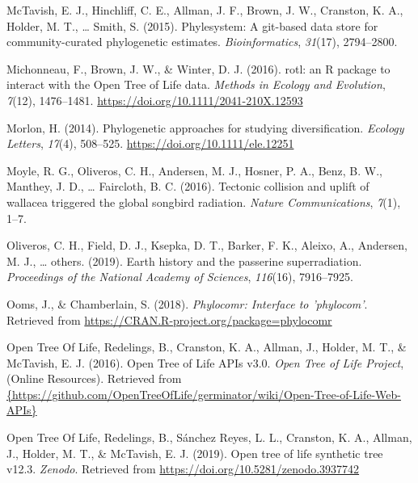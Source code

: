 \documentclass[english,man]{apa6}
\begin{document}
\leavevmode\hypertarget{ref-mctavish2015phylesystem}{}%
McTavish, E. J., Hinchliff, C. E., Allman, J. F., Brown, J. W., Cranston, K. A., Holder, M. T., \ldots{} Smith, S. (2015). Phylesystem: A git-based data store for community-curated phylogenetic estimates. \emph{Bioinformatics}, \emph{31}(17), 2794--2800.

\leavevmode\hypertarget{ref-Michonneau2016}{}%
Michonneau, F., Brown, J. W., \& Winter, D. J. (2016). rotl: an R package to interact with the Open Tree of Life data. \emph{Methods in Ecology and Evolution}, \emph{7}(12), 1476--1481. \url{https://doi.org/10.1111/2041-210X.12593}

\leavevmode\hypertarget{ref-Morlon2014}{}%
Morlon, H. (2014). Phylogenetic approaches for studying diversification. \emph{Ecology Letters}, \emph{17}(4), 508--525. \url{https://doi.org/10.1111/ele.12251}

\leavevmode\hypertarget{ref-moyle2016tectonic}{}%
Moyle, R. G., Oliveros, C. H., Andersen, M. J., Hosner, P. A., Benz, B. W., Manthey, J. D., \ldots{} Faircloth, B. C. (2016). Tectonic collision and uplift of wallacea triggered the global songbird radiation. \emph{Nature Communications}, \emph{7}(1), 1--7.

\leavevmode\hypertarget{ref-oliveros2019earth}{}%
Oliveros, C. H., Field, D. J., Ksepka, D. T., Barker, F. K., Aleixo, A., Andersen, M. J., \ldots{} others. (2019). Earth history and the passerine superradiation. \emph{Proceedings of the National Academy of Sciences}, \emph{116}(16), 7916--7925.

\leavevmode\hypertarget{ref-Ooms2018}{}%
Ooms, J., \& Chamberlain, S. (2018). \emph{Phylocomr: Interface to 'phylocom'}. Retrieved from \url{https://CRAN.R-project.org/package=phylocomr}

\leavevmode\hypertarget{ref-opentreeAPIs}{}%
Open Tree Of Life, Redelings, B., Cranston, K. A., Allman, J., Holder, M. T., \& McTavish, E. J. (2016). Open Tree of Life APIs v3.0. \emph{Open Tree of Life Project}, (Online Resources). Retrieved from \href{\%7Bhttps://github.com/OpenTreeOfLife/germinator/wiki/Open-Tree-of-Life-Web-APIs\%7D}{\{https://github.com/OpenTreeOfLife/germinator/wiki/Open-Tree-of-Life-Web-APIs\}}

\leavevmode\hypertarget{ref-opentreeoflife2019synth}{}%
Open Tree Of Life, Redelings, B., Sánchez Reyes, L. L., Cranston, K. A., Allman, J., Holder, M. T., \& McTavish, E. J. (2019). Open tree of life synthetic tree v12.3. \emph{Zenodo}. Retrieved from \url{https://doi.org/10.5281/zenodo.3937742}
\end{document}

